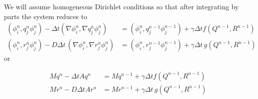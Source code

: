 \documentclass{article}
\begin{document}
We will assume homogeneous Dirichlet conditions so that after integrating by
parts the system reduces to
\begin{align}
    (\phi_i^{n}, q_j^n\phi_j^{n}) - \Delta t (\nabla \phi_i^{n}, \nabla q_j^n \phi_j^n)
    &= (\phi_i^n, q_j^{n-1}\phi_j^{n-1}) + \gamma \Delta t f(Q^{n-1}, R^{n-1})\\
    (\phi_i^n, r_j^n \phi_j^{n}) - D\Delta t\, (\nabla \phi_i^n,\nabla r_j^{n}\phi_j^n)
    &= (\phi_i^n, r_j^{n-1}\phi_j^{n-1}) + \gamma \Delta t\, g(Q^{n-1}, R^{n-1})
\end{align}
or

\begin{align}
    Mq^n - \Delta t Aq^n
    &= Mq^{n-1} + \gamma \Delta t f(Q^{n-1}, R^{n-1})\\
    Mr^n - D\Delta t Ar^n
    &= Mr^{n-1} + \gamma \Delta t\, g(Q^{n-1}, R^{n-1})
\end{align}
\end{document}
